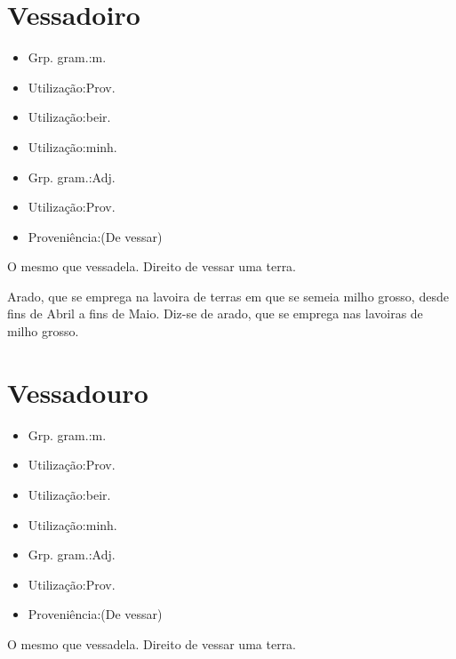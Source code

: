 \documentclass{article}
\begin{document}
\section{Vessadoiro}
\begin{itemize}
\item {Grp. gram.:m.}
\end{itemize}
\begin{itemize}
\item {Utilização:Prov.}
\end{itemize}
\begin{itemize}
\item {Utilização:beir.}
\end{itemize}
\begin{itemize}
\item {Utilização:minh.}
\end{itemize}
\begin{itemize}
\item {Grp. gram.:Adj.}
\end{itemize}
\begin{itemize}
\item {Utilização:Prov.}
\end{itemize}
\begin{itemize}
\item {Proveniência:(De \textunderscore vessar\textunderscore )}
\end{itemize}
O mesmo que \textunderscore vessadela\textunderscore .
Direito de vessar uma terra.

Arado, que se emprega na lavoira de terras em que se semeia milho grosso, desde fins de Abril a fins de Maio.
Diz-se de arado, que se emprega nas lavoiras de milho grosso.
\section{Vessadouro}
\begin{itemize}
\item {Grp. gram.:m.}
\end{itemize}
\begin{itemize}
\item {Utilização:Prov.}
\end{itemize}
\begin{itemize}
\item {Utilização:beir.}
\end{itemize}
\begin{itemize}
\item {Utilização:minh.}
\end{itemize}
\begin{itemize}
\item {Grp. gram.:Adj.}
\end{itemize}
\begin{itemize}
\item {Utilização:Prov.}
\end{itemize}
\begin{itemize}
\item {Proveniência:(De \textunderscore vessar\textunderscore )}
\end{itemize}
O mesmo que \textunderscore vessadela\textunderscore .
Direito de vessar uma terra.
\end{document}
